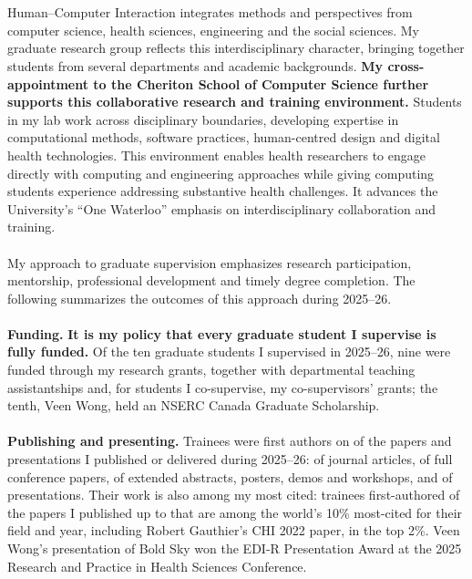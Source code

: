 \documentclass[11pt]{article}
\begin{document}
\sectionbreak
\ifAPR %
\\ \\
Human–Computer Interaction integrates methods and perspectives from computer science, health sciences, engineering and the social sciences. My graduate research group reflects this interdisciplinary character, bringing together students from several departments and academic backgrounds. \textbf{My cross-appointment to the Cheriton School of Computer Science further supports this collaborative research and training environment.} Students in my lab work across disciplinary boundaries, developing expertise in computational methods, software practices, human-centred design and digital health technologies. This environment enables health researchers to engage directly with computing and engineering approaches while giving computing students experience addressing substantive health challenges. It advances the University's ``One Waterloo'' emphasis on interdisciplinary collaboration and training.
\\ \\
My approach to graduate supervision emphasizes research participation, mentorship, professional development and timely degree completion. The following summarizes the outcomes of this approach during 2025--26.
\\ \\
\textbf{Funding.} \textbf{It is my policy that every graduate student I supervise is fully funded.} Of the ten graduate students I supervised in 2025--26, nine were funded through my research grants, together with departmental teaching assistantships and, for students I co-supervise, my co-supervisors' grants; the tenth, Veen Wong, held an NSERC Canada Graduate Scholarship.
\\ \\
\textbf{Publishing and presenting.} Trainees were first authors on  of the  papers and presentations I published or delivered during 2025--26:  of  journal articles,  of  full conference papers,  of  extended abstracts, posters, demos and workshops, and  of  presentations. Their work is also among my most cited: trainees first-authored  of the  papers I published up to  that are among the world's 10\% most-cited for their field and year, including Robert Gauthier's CHI 2022 paper, in the top 2\%. Veen Wong's presentation of Bold Sky won the EDI-R Presentation Award at the 2025 Research and Practice in Health Sciences Conference.
\end{document}
